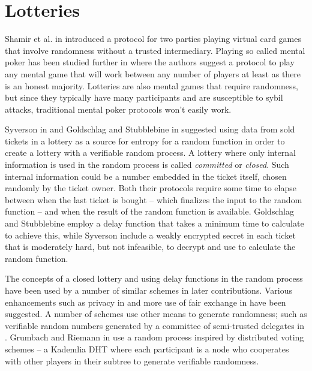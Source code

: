 \section{Lotteries}
\label{sec:lotteries}

Shamir et al. in \cite{shamir_mental_1981} introduced a protocol for two parties playing virtual card games that involve randomness without a trusted intermediary. Playing so called mental poker has been studied further in \cite{goldreich_how_1987} where the authors suggest a protocol to play any mental game that will work between any number of players at least as there is an honest majority. Lotteries are also mental games that require randomness, but since they typically have many participants and are susceptible to sybil attacks, traditional mental poker protocols won't easily work.

Syverson in \cite{syverson_weakly_1998} and Goldschlag and Stubblebine in \cite{goldschlag_publicly_1998} suggested using data from sold tickets in a lottery as a source for entropy for a random function in order to create a lottery with a verifiable random process. A lottery where only internal information is used in the random process is called \emph{committed} or \emph{closed}. Such internal information could be a number embedded in the ticket itself, chosen randomly by the ticket owner. Both their protocols require some time to elapse between when the last ticket is bought – which finalizes the input to the random function – and when the result of the random function is available. Goldschlag and Stubblebine employ a delay function that takes a minimum time to calculate to achieve this, while Syverson include a weakly encrypted secret in each ticket that is moderately hard, but not infeasible, to decrypt and use to calculate the random function.

The concepts of a closed lottery and using delay functions in the random process have been used by a number of similar schemes in later contributions. Various enhancements such as privacy in \cite{zhou_playing_2001} and more use of fair exchange in \cite{chow_e-lottery_2005} have been suggested. A number of schemes use other means to generate randomness; such as verifiable random numbers generated by a committee of semi-trusted delegates in \cite{fouque_sharing_2001, lee_design_2009, liu_improved_2014, xia_information_2019}. Grumbach and Riemann in \cite{grumbach_distributed_2017} use a random process inspired by distributed voting schemes – a Kademlia DHT where each participant is a node who cooperates with other players in their subtree to generate verifiable randomness. 

